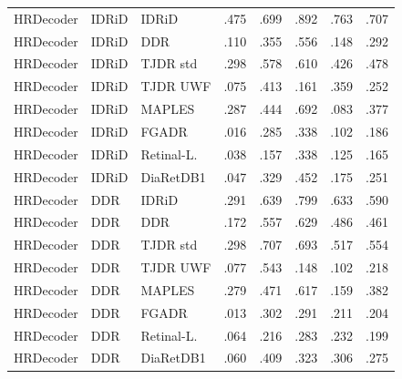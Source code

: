 {\begin{longtable}{l l l c c c c c}
HRDecoder & IDRiD & IDRiD & .475 & .699 & .892 & .763 & .707 \\
HRDecoder & IDRiD & DDR & .110 & .355 & .556 & .148 & .292 \\
HRDecoder & IDRiD & TJDR std & .298 & .578 & .610 & .426 & .478 \\
HRDecoder & IDRiD & TJDR UWF & .075 & .413 & .161 & .359 & .252 \\
HRDecoder & IDRiD & MAPLES & .287 & .444 & .692 & .083 & .377 \\
HRDecoder & IDRiD & FGADR & .016 & .285 & .338 & .102 & .186 \\
HRDecoder & IDRiD & Retinal-L. & .038 & .157 & .338 & .125 & .165 \\
HRDecoder & IDRiD & DiaRetDB1 & .047 & .329 & .452 & .175 & .251 \\
HRDecoder & DDR & IDRiD & .291 & .639 & .799 & .633 & .590 \\
HRDecoder & DDR & DDR & .172 & .557 & .629 & .486 & .461 \\
HRDecoder & DDR & TJDR std & .298 & .707 & .693 & .517 & .554 \\
HRDecoder & DDR & TJDR UWF & .077 & .543 & .148 & .102 & .218 \\
HRDecoder & DDR & MAPLES & .279 & .471 & .617 & .159 & .382 \\
HRDecoder & DDR & FGADR & .013 & .302 & .291 & .211 & .204 \\
HRDecoder & DDR & Retinal-L. & .064 & .216 & .283 & .232 & .199 \\
HRDecoder & DDR & DiaRetDB1 & .060 & .409 & .323 & .306 & .275 \\
\end{longtable}
}
